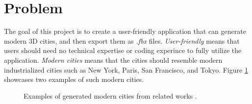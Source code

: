 \newpage
\section{Problem}

The goal of this project is to create a user-friendly application that can generate modern 3D cities, and then export them as \textit{.fbx} files.
\textit{User-friendly} means that users should need no technical expertise or coding experince to fully utilize the application.
\textit{Modern cities} means that the cities should resemble modern industrialized
cities such as New York, Paris, San Francisco, and Tokyo. Figure \ref{fig:ModernCities}
showcases two examples of such modern cities.

\begin{figure}[h!]
  \centering

  \begin{subfigure}[b]{0.48\textwidth}
  \end{subfigure}
  \quad
  \begin{subfigure}[b]{0.48\textwidth}
  \end{subfigure}

  \caption{Examples of generated modern cities from related works \cite{yoav_and_pascal}\cite{cl3ver}.}
  \label{fig:ModernCities}
\end{figure}

